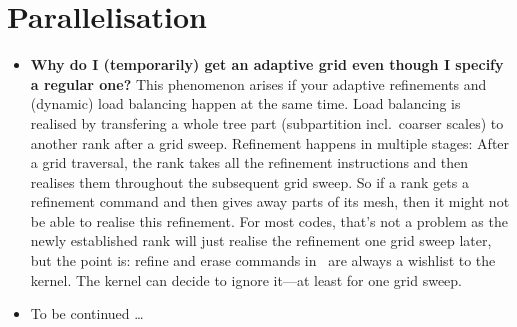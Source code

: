 \section{Parallelisation}

\begin{itemize}
  \item \textbf{Why do I (temporarily) get an adaptive grid even though I
  specify a regular one?}
  This phenomenon arises if your adaptive refinements and (dynamic) load
  balancing happen at the same time. Load balancing is realised by transfering a
  whole tree part (subpartition incl.~coarser scales) to another rank after a
  grid sweep. Refinement happens in multiple stages: After a grid traversal, the
  rank takes all the refinement instructions and then realises them throughout
  the subsequent grid sweep. So if a rank gets a refinement command and then
  gives away parts of its mesh, then it might not be able to realise this 
  refinement. For most codes, that's not a problem as the newly established rank
  will just realise the refinement one grid sweep later, but the point is:
  refine and erase commands in \Peano\ are always a wishlist to the kernel. The
  kernel can decide to ignore it---at least for one grid sweep.
  \item To be continued \dots
\end{itemize}

